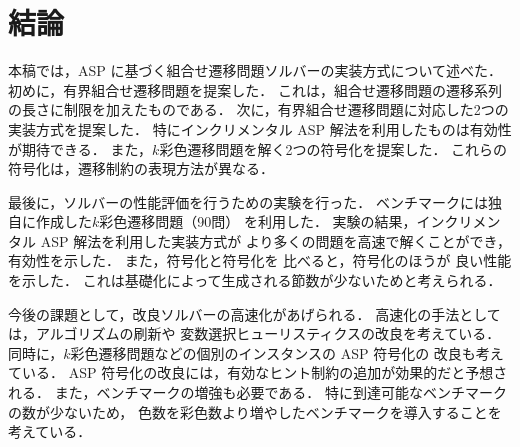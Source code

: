 \section{結論} \label{chap:conclusion}
本稿では，ASP に基づく組合せ遷移問題ソルバーの実装方式について述べた．
初めに，有界組合せ遷移問題を提案した．
これは，組合せ遷移問題の遷移系列の長さに制限を加えたものである．
次に，有界組合せ遷移問題に対応した2つの実装方式を提案した．
特にインクリメンタル ASP 解法を利用したものは有効性が期待できる．
また，$k$彩色遷移問題を解く2つの符号化を提案した．
これらの符号化は，遷移制約の表現方法が異なる．

最後に，ソルバーの性能評価を行うための実験を行った．
ベンチマークには独自に作成した$k$彩色遷移問題（90問）
を利用した．
実験の結果，インクリメンタル ASP 解法を利用した実装方式が
より多くの問題を高速で解くことができ，有効性を示した．
また，符号化と符号化を
比べると，符号化のほうが
良い性能を示した．
これは基礎化によって生成される節数が少ないためと考えられる．

今後の課題として，改良ソルバーの高速化があげられる．
高速化の手法としては，アルゴリズムの刷新や
変数選択ヒューリスティクスの改良を考えている．
同時に，$k$彩色遷移問題などの個別のインスタンスの ASP 符号化の
改良も考えている．
ASP 符号化の改良には，有効なヒント制約の追加が効果的だと予想される．
また，ベンチマークの増強も必要である．
特に到達可能なベンチマークの数が少ないため，
色数を彩色数より増やしたベンチマークを導入することを考えている．